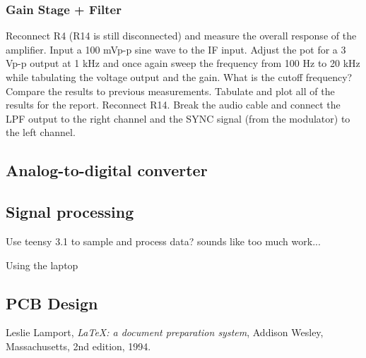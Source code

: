 \documentclass[letterpaper, 11pt]{article}
\begin{document}
\subsubsection{Gain Stage + Filter}
Reconnect R4 (R14 is still disconnected) and measure the overall response of the amplifier. Input a 100 mVp-p sine wave to the IF input. Adjust the pot for a 3 Vp-p output at 1 kHz and once again sweep the frequency from 100 Hz to 20 kHz while tabulating the voltage output and the gain. What is the cutoff frequency? Compare the results to previous measurements. Tabulate and plot all of the results for the report.
Reconnect R14. Break the audio cable and connect the LPF output to the right channel and the SYNC signal (from the modulator) to the left channel. 


\subsection{Analog-to-digital converter}

\subsection{Signal processing}

Use teensy 3.1 to sample and process data? sounds like too much work...

Using the laptop

\subsection{PCB Design}

\begin{thebibliography}{9}

  Leslie Lamport,
  \emph{\LaTeX: a document preparation system},
  Addison Wesley, Massachusetts,
  2nd edition,
  1994.

\end{thebibliography}
\end{document}

